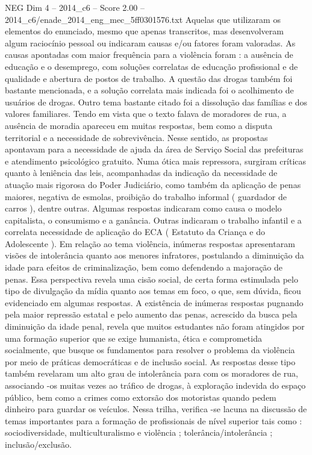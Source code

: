 \begin{textsample}{NEG Dim 4 – 2014\_c6 – Score 2.00 – 2014\_c6/enade\_2014\_eng\_mec\_5ff0301576.txt}
Aquelas que utilizaram os elementos do enunciado, mesmo que apenas transcritos, mas desenvolveram algum raciocínio pessoal ou indicaram causas e/ou fatores foram valoradas.
As causas apontadas com maior frequência para a violência foram : a ausência de educação e o desemprego, com soluções correlatas de educação profissional e de qualidade e abertura de postos de trabalho.
A questão das drogas também foi bastante mencionada, e a solução correlata mais indicada foi o acolhimento de usuários de drogas.
Outro tema bastante citado foi a dissolução das famílias e dos valores familiares.
Tendo em vista que o texto falava de moradores de rua, a ausência de moradia apareceu em muitas respostas, bem como a disputa territorial e a necessidade de sobrevivência.
Nesse sentido, as propostas apontavam para a necessidade de ajuda da área de Serviço Social das prefeituras e atendimento psicológico gratuito.
Numa ótica mais repressora, surgiram críticas quanto à leniência das leis, acompanhadas da indicação da necessidade de atuação mais rigorosa do Poder Judiciário, como também da aplicação de penas maiores, negativa de esmolas, proibição do trabalho informal ( guardador de carros ), dentre outras.
Algumas respostas indicaram como causa o modelo capitalista, o consumismo e a ganância.
Outras indicaram o trabalho infantil e a correlata necessidade de aplicação do ECA ( Estatuto da Criança e do Adolescente ).
Em relação ao tema violência, inúmeras respostas apresentaram visões de intolerância quanto aos menores infratores, postulando a diminuição da idade para efeitos de criminalização, bem como defendendo a majoração de penas.
Essa perspectiva revela uma cisão social, de certa forma estimulada pelo tipo de divulgação da mídia quanto aos temas em foco, o que, sem dúvida, ficou evidenciado em algumas respostas.
A existência de inúmeras respostas pugnando pela maior repressão estatal e pelo aumento das penas, acrescido da busca pela diminuição da idade penal, revela que muitos estudantes não foram atingidos por uma formação superior que se exige humanista, ética e comprometida socialmente, que busque os fundamentos para resolver o problema da violência por meio de práticas democráticas e de inclusão social.
As respostas desse tipo também revelaram um alto grau de intolerância para com os moradores de rua, associando -os muitas vezes ao tráfico de drogas, à exploração indevida do espaço público, bem como a crimes como extorsão dos motoristas quando pedem dinheiro para guardar os veículos.
Nessa trilha, verifica -se lacuna na discussão de temas importantes para a formação de profissionais de nível superior tais como : sociodiversidade, multiculturalismo e violência ; tolerância/intolerância ; inclusão/exclusão.

\end{textsample}

